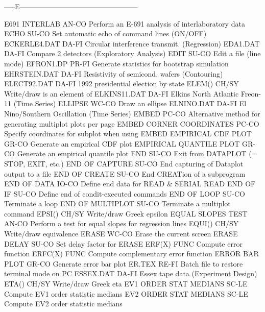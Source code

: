 -----E--------------------------------------------------

E691 INTERLAB               AN-CO Perform an E-691 analysis of interlaboratory data
ECHO                        SU-CO Set automatic echo of command lines (ON/OFF)
ECKERLE4.DAT                DA-FI Circular interference transmit. (Regression)
EDA1.DAT                    DA-FI Compare 2 detectors (Exploratory Analysis)
EDIT                        SU-CO Edit a file (line mode)
EFRON1.DP                   PR-FI Generate statistics for bootstrap simulation
EHRSTEIN.DAT                DA-FI Resistivity of semicond. wafers (Contouring)
ELECT92.DAT                 DA-FI 1992 presidential election by state
ELEM()                      CH/SY Write/draw is an element of
ELKINS11.DAT                DA-FI Elkins North Atlantic Freon-11 (Time Series)
ELLIPSE                     WC-CO Draw an ellipse
ELNINO.DAT                  DA-FI El Nino/Southern Oscillation (Time Series)
EMBED                       PC-CO Alternative method for generating multiplot plots per page
EMBED CORNER COORDINATES    PC-CO Specify coordinates for subplot when using EMBED
EMPIRICAL CDF PLOT          GR-CO Generate an empirical CDF plot
EMPIRICAL QUANTILE PLOT     GR-CO Generate an empirical quantile plot
END                         SU-CO Exit from DATAPLOT (= STOP, EXIT, etc.)
END OF CAPTURE              SU-CO End capturing of Dataplot output to a file
END OF CREATE               SU-CO End CREATion of a subprogram
END OF DATA                 IO-CO Define end data for READ & SERIAL READ
END OF IF                   SU-CO Define end of condit-executed commands
END OF LOOP                 SU-CO Terminate a loop
END OF MULTIPLOT            SU-CO Terminate a multiplot command
EPSI()                      CH/SY Write/draw Greek epsilon
EQUAL SLOPES TEST           AN-CO Perform a test for equal slopes for regression lines
EQUI()                      CH/SY Write/draw equivalence
ERASE                       WC-CO Erase the current screen
ERASE DELAY                 SU-CO Set delay factor for ERASE
ERF(X)                      FUNC  Compute error function
ERFC(X)                     FUNC  Compute complementary error function
ERROR BAR PLOT              GR-CO Generate error bar plot
ER.TEX                      RE-FI Batch file to restore terminal mode on PC
ESSEX.DAT                   DA-FI Essex tape data (Experiment Design)
ETA()                       CH/SY Write/draw Greek eta
EV1 ORDER STAT MEDIANS      SC-LE Compute EV1 order statistic medians
EV2 ORDER STAT MEDIANS      SC-LE Compute EV2 order statistic medians
